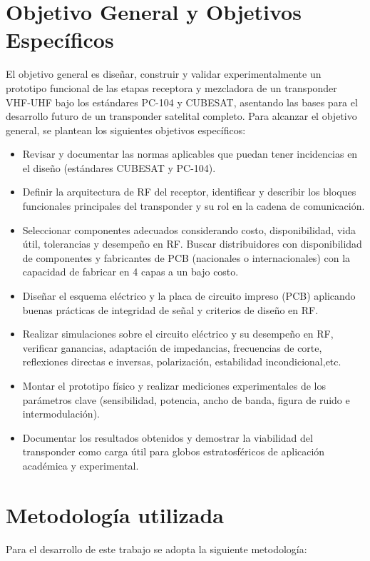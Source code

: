 \documentclass[11pt,a4paper,twoside]{report}
\begin{document}
	\section{Objetivo General y Objetivos Específicos}
	El objetivo general es diseñar, construir y validar experimentalmente un prototipo funcional de las etapas receptora y mezcladora de un transponder VHF-UHF bajo los estándares PC-104 y CUBESAT, asentando las bases para el desarrollo futuro de un transponder satelital completo. Para alcanzar el objetivo general, se plantean los siguientes objetivos específicos:
	\begin{itemize}
		\item Revisar y documentar las normas aplicables que puedan tener incidencias en el diseño (estándares CUBESAT y PC-104).
		
		\item Definir la arquitectura de RF del receptor, identificar y describir los bloques funcionales principales del transponder y su rol en la cadena de comunicación.
		
		\item Seleccionar componentes adecuados considerando costo, disponibilidad, vida útil, tolerancias y desempeño en RF. Buscar distribuidores con disponibilidad de componentes y fabricantes de PCB (nacionales o internacionales) con la capacidad de fabricar en 4 capas a un bajo costo.
		
		\item Diseñar el esquema eléctrico y la placa de circuito impreso (PCB) aplicando buenas prácticas de integridad de señal y criterios de diseño en RF.
		
		\item Realizar simulaciones sobre el circuito eléctrico y su desempeño en RF, verificar ganancias, adaptación de impedancias, frecuencias de corte, reflexiones directas e inversas, polarización, estabilidad incondicional,etc.
		
		\item Montar el prototipo físico y realizar mediciones experimentales de los parámetros clave (sensibilidad, potencia, ancho de banda, figura de ruido e intermodulación).
		
		\item Documentar los resultados obtenidos y demostrar la viabilidad del transponder como carga útil para globos estratosféricos de aplicación académica y experimental.
	\end{itemize}
	
	\section{Metodología utilizada}
	Para el desarrollo de este trabajo se adopta la siguiente metodología:
	
\end{document}
